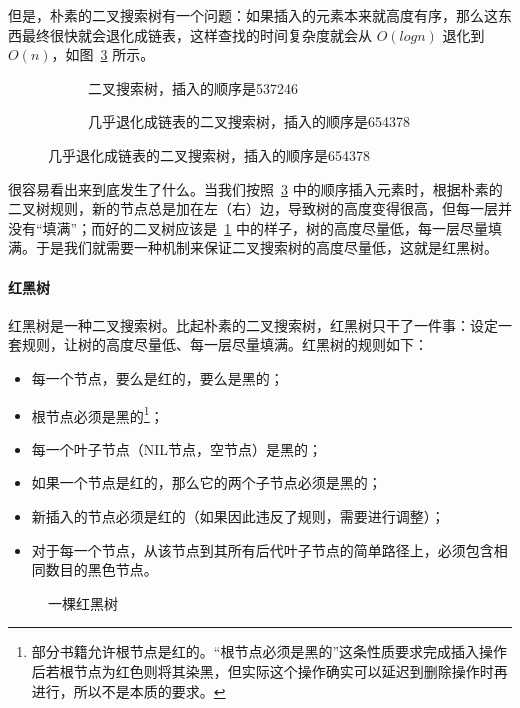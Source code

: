 但是，朴素的二叉搜索树有一个问题：如果插入的元素本来就高度有序，那么这东西最终很快就会退化成链表，这样查找的时间复杂度就会从 $O(log n)$ 退化到 $O(n)$，如图~\cref{fig:bad-bst} 所示。

\begin{figure}
    \begin{subfigure}{0.45\textwidth}
        \centering
        
        \caption{二叉搜索树，插入的顺序是537246}
        \label{fig:bst}
    \end{subfigure}
    \hfill
    \begin{subfigure}{0.45\textwidth}
        \centering
        
        \caption{几乎退化成链表的二叉搜索树，插入的顺序是654378}
        \label{fig:bad-bst}
    \end{subfigure}
\end{figure}

很容易看出来到底发生了什么。当我们按照~\cref{fig:bad-bst} 中的顺序插入元素时，根据朴素的二叉树规则，新的节点总是加在左（右）边，导致树的高度变得很高，但每一层并没有“填满”；而好的二叉树应该是~\cref{fig:bst} 中的样子，树的高度尽量低，每一层尽量填满。于是我们就需要一种机制来保证二叉搜索树的高度尽量低，这就是红黑树。

\paragraph{红黑树}

红黑树是一种二叉搜索树。比起朴素的二叉搜索树，红黑树只干了一件事：设定一套规则，让树的高度尽量低、每一层尽量填满。红黑树的规则如下：
\begin{itemize}
    \item 每一个节点，要么是红的，要么是黑的；
    \item 根节点必须是黑的\footnote{部分书籍允许根节点是红的。“根节点必须是黑的”这条性质要求完成插入操作后若根节点为红色则将其染黑，但实际这个操作确实可以延迟到删除操作时再进行，所以不是本质的要求。}；
    \item 每一个叶子节点（NIL节点，空节点）是黑的；
    \item 如果一个节点是红的，那么它的两个子节点必须是黑的；
    \item 新插入的节点必须是红的（如果因此违反了规则，需要进行调整）；
    \item 对于每一个节点，从该节点到其所有后代叶子节点的简单路径上，必须包含相同数目的黑色节点。
\end{itemize}

\begin{figure}
    \centering
    
    \caption{一棵红黑树}
    \label{fig:rbt}
\end{figure}

